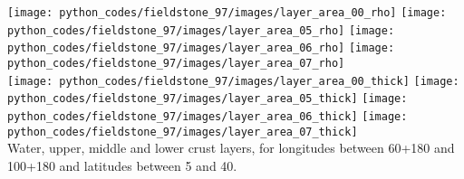 \begin{center}
\texttt{[image: python\_codes/fieldstone\_97/images/layer\_area\_00\_rho]}
\texttt{[image: python\_codes/fieldstone\_97/images/layer\_area\_05\_rho]}
\texttt{[image: python\_codes/fieldstone\_97/images/layer\_area\_06\_rho]}
\texttt{[image: python\_codes/fieldstone\_97/images/layer\_area\_07\_rho]}\\
\texttt{[image: python\_codes/fieldstone\_97/images/layer\_area\_00\_thick]}
\texttt{[image: python\_codes/fieldstone\_97/images/layer\_area\_05\_thick]}
\texttt{[image: python\_codes/fieldstone\_97/images/layer\_area\_06\_thick]}
\texttt{[image: python\_codes/fieldstone\_97/images/layer\_area\_07\_thick]}\\
{\captionfont Water, upper, middle and lower crust layers, for longitudes between
60+180 and 100+180 and latitudes between 5 and 40.}
\end{center}

